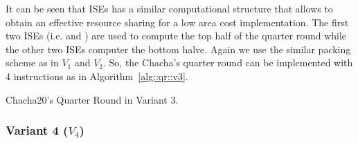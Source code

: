 It can be seen that ISEs has a similar computational structure that allows to obtain an effective resource sharing for a low area cost implementation.
The first two ISEs (i.e.  and ) are used to compute the top half of the quarter round while the other two ISEs computer the bottom halve.
Again we use the similar packing scheme as in $V_1$ and $V_2$. So, the Chacha's quarter round can be implemented with 4 instructions as in Algorithm~\ref{alg::qr::v3}.

\begin{algorithm}
\BlankLine
{}
\caption{Chacha20's Quarter Round in Variant 3.}
\label{alg::qr::v3}
\end{algorithm}


\subsubsection{Variant 4 ($V_4$)}


